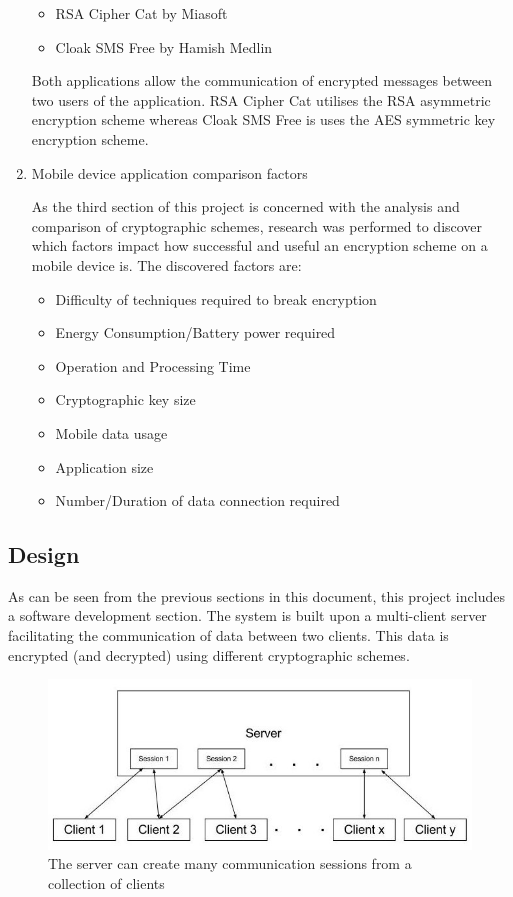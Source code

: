 \documentclass[a4paper,11pt]{article}
\begin{document}
\begin{enumerate}
  \begin{itemize}
    \item RSA Cipher Cat by Miasoft
    \item Cloak SMS Free by Hamish Medlin
  \end{itemize}
  Both applications allow the communication of encrypted messages between two users of the application. RSA Cipher Cat utilises the RSA asymmetric encryption scheme whereas Cloak SMS Free is uses the AES symmetric key encryption scheme.
  \item
  \begin{description}
    \item[Mobile device application comparison factors] 
  \end{description}
  As the third section of this project is concerned with the analysis and comparison of cryptographic schemes, research was performed to discover which factors impact how successful and useful an encryption scheme on a mobile device is. The discovered factors are:
  \begin{itemize}
    \item Difficulty of techniques required to break encryption
    \item Energy Consumption/Battery power required
    \item Operation and Processing Time
    \item Cryptographic key size
    \item Mobile data usage
    \item Application size
    \item Number/Duration of data connection required
  \end{itemize}
\end{enumerate}

\subsection{Design}

As can be seen from the previous sections in this document, this project includes a software development section. The system is built upon a multi-client server facilitating the communication of data between two clients.  This data is encrypted (and decrypted) using different cryptographic schemes.

\begin{figure}[htb]
\centering
\includegraphics[scale=0.35]{designs1.jpg}
\caption{The server can create many communication sessions from a collection of clients}
\label{fig:designs1}
\end{figure}
\end{document}
